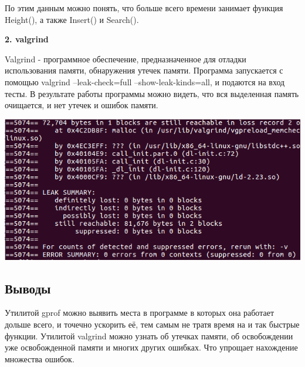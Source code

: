 \documentclass[12pt]{article}
\begin{document}
По этим данным можно понять, что больше всего времени занимает функция Height(), а также Insert() и Search().

\par \textbf{2. valgrind}
\par Valgrind - программное обеспечение, предназначенное для отладки использования памяти, обнаружения утечек памяти. Программа запускается с помощью valgrind --leak-check=full --show-leak-kinds=all, и подаются на вход тесты. В результате работы программы можно видеть, что вся выделенная память очищается, и нет утечек и ошибок памяти.

\noindent \includegraphics{valgrind}

\subsection*{Выводы}

Утилитой gprof можно выявить места в программе в которых она работает дольше всего, и точечно ускорить её, тем самым не тратя время на и так быстрые функции.
Утилитой valgrind можно узнать об утечках памяти, об освобождении уже освобожденной памяти и многих других ошибках. Что упрощает нахождение множества ошибок.
\end{document}
